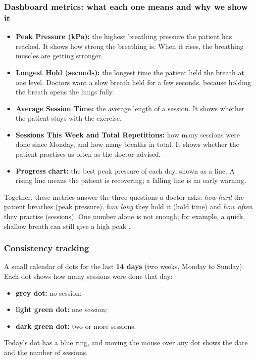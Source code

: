 \documentclass[12pt,a4paper]{article}
\begin{document}
\subsubsection{Dashboard metrics: what each one means and why we show it}
\label{sec:metrics}
\begin{itemize}[itemsep=6pt]
  \item \textbf{Peak Pressure (kPa):} the highest breathing pressure the patient has reached. It shows how strong the breathing is. When it rises, the breathing muscles are getting stronger.
  \item \textbf{Longest Hold (seconds):} the longest time the patient held the breath at one level. Doctors want a slow breath held for a few seconds, because holding the breath opens the lungs fully.
  \item \textbf{Average Session Time:} the average length of a session. It shows whether the patient stays with the exercise.
  \item \textbf{Sessions This Week and Total Repetitions:} how many sessions were done since Monday, and how many breaths in total. It shows whether the patient practises as often as the doctor advised.
  \item \textbf{Progress chart:} the best peak pressure of each day, shown as a line. A rising line means the patient is recovering; a falling line is an early warning.
\end{itemize}

Together, these metrics answer the three questions a doctor asks: \emph{how hard} the patient breathes (peak pressure), \emph{how long} they hold it (hold time) and \emph{how often} they practise (sessions). One number alone is not enough; for example, a quick, shallow breath can still give a high peak \cite{silva}.

\subsubsection{Consistency tracking}
A small calendar of dots for the last \textbf{14 days} (two weeks, Monday to Sunday). Each dot shows how many sessions were done that day:
\begin{itemize}
  \item \textbf{grey dot:} no session;
  \item \textbf{light green dot:} one session;
  \item \textbf{dark green dot:} two or more sessions.
\end{itemize}
Today's dot has a blue ring, and moving the mouse over any dot shows the date and the number of sessions.
\end{document}
